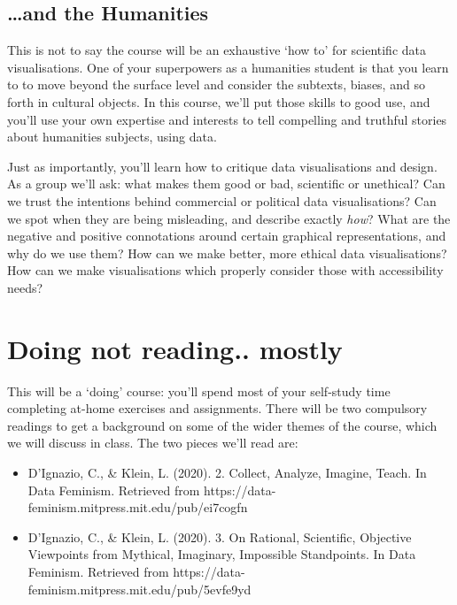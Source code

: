 \documentclass[
  letterpaper,
  DIV=11,
  numbers=noendperiod]{scrreprt}
\begin{document}
\subsection*{\ldots and the Humanities}\label{and-the-humanities}

This is not to say the course will be an exhaustive `how to' for
scientific data visualisations. One of your superpowers as a humanities
student is that you learn to to move beyond the surface level and
consider the subtexts, biases, and so forth in cultural objects. In this
course, we'll put those skills to good use, and you'll use your own
expertise and interests to tell compelling and truthful stories about
humanities subjects, using data.

Just as importantly, you'll learn how to critique data visualisations
and design. As a group we'll ask: what makes them good or bad,
scientific or unethical? Can we trust the intentions behind commercial
or political data visualisations? Can we spot when they are being
misleading, and describe exactly \emph{how}? What are the negative and
positive connotations around certain graphical representations, and why
do we use them? How can we make better, more ethical data
visualisations? How can we make visualisations which properly consider
those with accessibility needs?

\section*{Doing not reading.. mostly}\label{doing-not-reading..-mostly}


This will be a `doing' course: you'll spend most of your self-study time
completing at-home exercises and assignments. There will be two
compulsory readings to get a background on some of the wider themes of
the course, which we will discuss in class. The two pieces we'll read
are:

\begin{itemize}
\item
  D'Ignazio, C., \& Klein, L. (2020). 2. Collect, Analyze, Imagine,
  Teach. In Data Feminism. Retrieved from
  https://data-feminism.mitpress.mit.edu/pub/ei7cogfn
\item
  D'Ignazio, C., \& Klein, L. (2020). 3. On Rational, Scientific,
  Objective Viewpoints from Mythical, Imaginary, Impossible Standpoints.
  In Data Feminism. Retrieved from
  https://data-feminism.mitpress.mit.edu/pub/5evfe9yd
\end{itemize}
\end{document}
